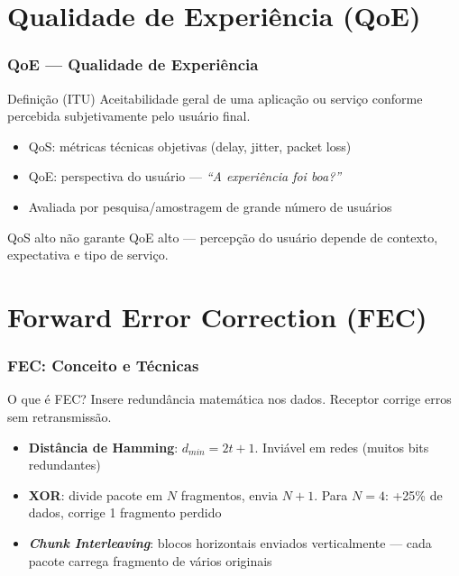 \documentclass{beamer}
\begin{document}
  \section{Qualidade de Experiência (QoE)}

  \begin{frame}
    \frametitle{QoE — Qualidade de Experiência}
    \begin{block}{Definição (ITU)}
      Aceitabilidade geral de uma aplicação ou serviço conforme \alert{percebida
      subjetivamente} pelo usuário final.
    \end{block}
    \vspace{0.5em}
    \begin{itemize}
      \item<2-> QoS: métricas técnicas objetivas (delay, jitter, packet loss)
      \item<3-> QoE: perspectiva do usuário — \textit{``A experiência foi boa?''}
      \item<4-> Avaliada por pesquisa/amostragem de grande número de usuários
    \end{itemize}
    \vspace{0.5em}
    \begin{examples}
      QoS alto não garante QoE alto — percepção do usuário depende de contexto,
      expectativa e tipo de serviço.
    \end{examples}
  \end{frame}

  \section{Forward Error Correction (FEC)}

  \begin{frame}
    \frametitle{FEC: Conceito e Técnicas}
    \begin{block}{O que é FEC?}
      Insere redundância matemática nos dados. Receptor corrige erros sem
      retransmissão.
    \end{block}
    \vspace{0.5em}
    \begin{itemize}
      \item<2-> \textbf{Distância de Hamming}: $d_{min} = 2t+1$. Inviável em redes
        (muitos bits redundantes)
      \item<3-> \textbf{XOR}: divide pacote em $N$ fragmentos, envia $N+1$.
        Para $N=4$: +25\% de dados, corrige 1 fragmento perdido
      \item<4-> \textbf{\textit{Chunk Interleaving}}: blocos horizontais enviados
        verticalmente — cada pacote carrega fragmento de vários originais
    \end{itemize}
  \end{frame}
\end{document}
